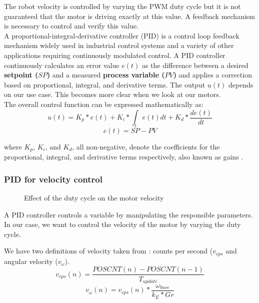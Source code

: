 The robot velocity is controlled by varying the PWM duty cycle but it is not guaranteed that the motor is driving exactly at this value. A feedback mechanism is necessary to control and verify this value.\\
\vskip 0.1in
\noindent
A proportional-integral-derivative controller (PID) is a control loop feedback mechanism widely used in industrial control systems and a variety of other applications requiring continuously modulated control. A PID controller continuously calculates an error value $e(t)$ as the difference between a desired \textbf{setpoint ($SP$)} and a measured \textbf{process variable ($PV$)} and applies a correction based on proportional, integral, and derivative terms. The output $u(t)$ depends on our use case. This becomes more clear when we look at our motors.\\
The overall control function can be expressed mathematically as: 
$$u(t)= K_{p}*e(t) + K_{i}*\int_t e(t) dt + K_{d}*\frac{d e(t)}{dt} $$
$$e(t) = SP - PV$$

\noindent
where $K_p$, $K_i$, and $K_d$, all non-negative, denote the coefficients for the proportional, integral, and derivative terms respectively, also known as gains \cite{aastrom2002control}.

\subsubsection*{PID for velocity control}

\begin{figure}
    \centering
{}
    \caption{Effect of the duty cycle on the motor velocity} \label{fig:DC_V}
\end{figure}


A PID controller controls a variable by manipulating the responsible parameters. In our case, we want to control the velocity of the motor by varying the duty cycle. 

We have two definitions of velocity taken from \cite{alex}: counts per second ($v_{cps}$ and angular velocity ($v_\omega$).
$$v_{cps}(n) = \frac{POSCNT(n) - POSCNT(n-1)}{T_{update}}$$
$$v_{\omega}(n) = v_{cps}(n) * \frac{\omega_{base}}{k_{E}*Gr}$$

